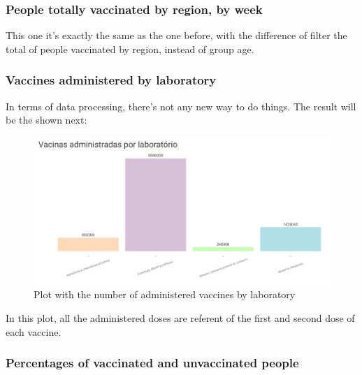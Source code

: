 \subsubsection{People totally vaccinated by region, by week}

This one it's exactly the same as the one before, with the difference of filter the total of people vaccinated by region, instead of group age.

\subsubsection{Vaccines administered by laboratory}

In terms of data processing, there's not any new way to do things. The result will be the shown next:\\
\begin{figure}[H]
\centering
\includegraphics[width=350pt,trim=10 0 0 -10mm]{images/p5.png}
\caption{Plot with the number of administered vaccines by laboratory}
\label{fig:ages-vac-1}
\end{figure}

In this plot, all the administered doses are referent of the first and second dose of each vaccine.

\subsubsection{Percentages of vaccinated and unvaccinated people}

